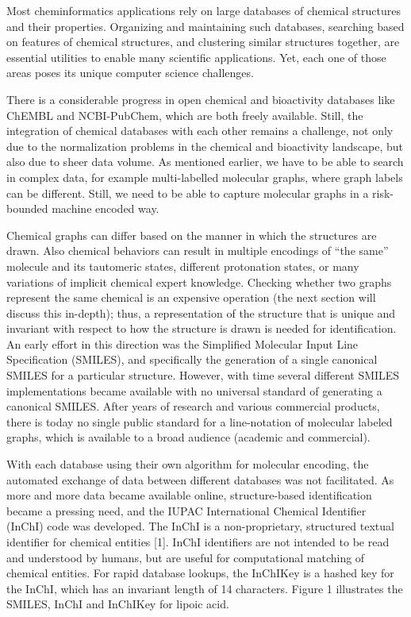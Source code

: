 \documentclass{sig-alternate}
\begin{document}
Most cheminformatics applications rely on large databases of chemical structures
and their properties. Organizing and maintaining such databases, searching based
on features of chemical structures, and clustering similar structures together,
are essential utilities to enable many scientific applications. Yet, each one of
those areas poses its unique computer science challenges.

There is a considerable progress in open chemical and bioactivity databases like
ChEMBL and NCBI-PubChem, which are both freely available. Still, the integration
of chemical databases with each other remains a challenge, not only due to the
normalization problems in the chemical and bioactivity landscape, but also due
to sheer data volume. As mentioned earlier, we have to be able to
search in complex data, for example multi-labelled molecular graphs, where
graph labels can be different. Still, we need to be able to capture
molecular graphs in a risk-bounded machine encoded way.

Chemical graphs can differ based on the manner in which the structures
are drawn. Also chemical behaviors can result in multiple encodings of
``the same'' molecule and its tautomeric states, different protonation
states, or many variations of implicit chemical expert
knowledge. Checking whether two graphs represent the same chemical is
an expensive operation (the next section will discuss this in-depth);
thus, a representation of the structure that is unique and invariant
with respect to how the structure is drawn is needed for
identification. An early effort in this direction was the Simplified
Molecular Input Line Specification (SMILES), and specifically the
generation of a single canonical SMILES for a particular structure. However,
with time several
different SMILES implementations became available with no universal
standard of generating a canonical SMILES. After years of research and various
commercial products, there is today no single public standard for a
line-notation of molecular labeled graphs, which is available to a
broad audience (academic and
commercial). %

With each database using their own algorithm for molecular encoding,
the automated exchange of data between different databases was not
facilitated. As more and more data became available online,
structure-based identification became a pressing need, and the IUPAC
International Chemical Identifier (InChI) code was developed. The
InChI is a non-proprietary, structured textual identifier for chemical
entities [1]. InChI identifiers are not intended to be read and
understood by humans, but are useful for computational matching of
chemical entities. For rapid database lookups, the InChIKey is a
hashed key for the InChI, which has an invariant length of 14
characters. Figure 1 illustrates the SMILES, InChI and InChIKey for
lipoic acid.
\end{document}

